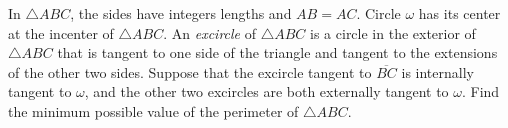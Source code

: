 In $\triangle ABC$, the sides have integers lengths and $AB=AC$. Circle $\omega$ has its center at the incenter of $\triangle ABC$. An \textit{excircle} of $\triangle ABC$ is a circle in the exterior of $\triangle ABC$ that is tangent to one side of the triangle and tangent to the extensions of the other two sides. Suppose that the excircle tangent to $\overline{BC}$ is internally tangent to $\omega$, and the other two excircles are both externally tangent to $\omega$. Find the minimum possible value of the perimeter of $\triangle ABC$.